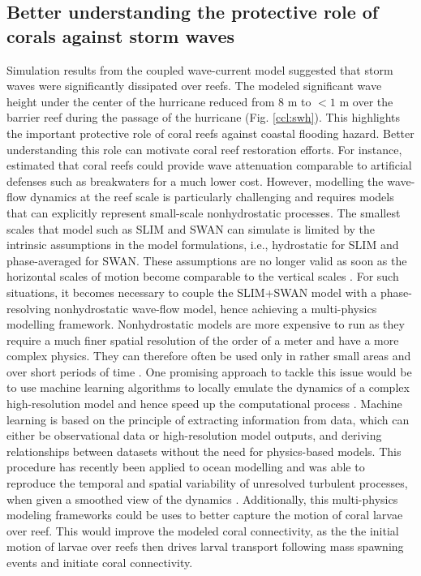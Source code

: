 \subsection*{Better understanding the protective role of corals against storm waves}
Simulation results from the coupled wave-current model suggested that storm waves were significantly dissipated over reefs. The modeled significant wave height under the center of the hurricane reduced from 8 m to $<1$ m over the barrier reef during the passage of the hurricane (Fig. \ref{ccl:swh}). This highlights the important protective role of coral reefs against coastal flooding hazard. Better understanding this role can motivate coral reef restoration efforts. For instance, \cite{ferrario2014effectiveness} estimated that coral reefs could provide wave attenuation comparable to artificial defenses such as breakwaters for a much lower cost. However, modelling the wave-flow dynamics at the reef scale is particularly challenging and requires models that can explicitly represent small-scale nonhydrostatic processes. The smallest scales that model such as SLIM and SWAN can simulate is limited by the intrinsic assumptions in the model formulations, i.e., hydrostatic for SLIM and phase-averaged for SWAN. These assumptions are no longer valid as soon as the horizontal scales of motion become comparable to the vertical scales \citep{marshall1997hydrostatic}. For such situations, it becomes necessary to couple the SLIM+SWAN model with a phase-resolving nonhydrostatic wave-flow model, hence achieving a multi-physics modelling framework. Nonhydrostatic models are more expensive to	 run as they require a much finer spatial resolution of the order of a meter and have a more complex physics. They can therefore often be used only in rather small areas and over short periods of time \citep{fringer2019future}. One promising approach to tackle this issue would be to use machine learning algorithms to locally emulate the dynamics of a complex high-resolution model and hence speed up the computational process \citep{kasim2021building}. Machine learning is based on the principle of extracting information from data, which can either be observational data or high-resolution model outputs, and deriving relationships between datasets without the need for physics-based models. This procedure has recently been applied to ocean modelling and was able to reproduce the temporal and spatial variability of unresolved turbulent processes, when given a smoothed view of the dynamics \citep{bolton2019applications}. Additionally, this multi-physics modeling frameworks could be uses to better capture the motion of coral larvae over reef. This would improve the modeled coral connectivity, as the the initial motion of larvae over reefs then drives larval transport following mass spawning events and initiate coral connectivity. 

